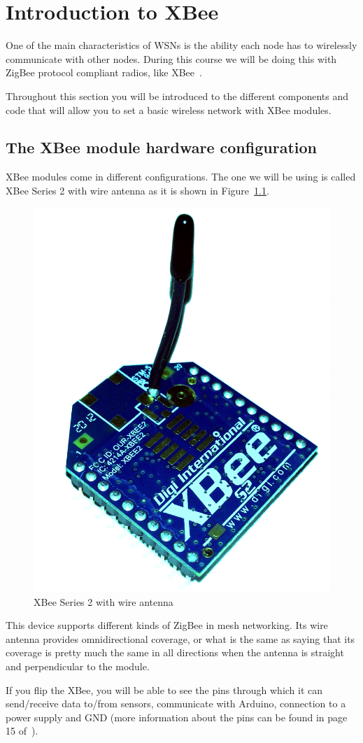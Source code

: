 \chapter{Introduction to XBee}\label{introToXBee}

One of the main characteristics of WSNs is the ability each node has to wirelessly communicate with other nodes. 
During this course we will be doing this with ZigBee protocol compliant radios, like XBee~\cite{faludi2010bws}.

Throughout this section you will be introduced to the different components and code that will allow you to set a basic wireless network with XBee modules.

\section{The XBee module hardware configuration}\label{xbee:hardware}

XBee modules come in different configurations. The one we will be using is called XBee Series 2 with wire antenna as it is shown in Figure~\ref{fig:xbee}.

\begin{figure}[htbp]
  \centering
  \includegraphics[width=0.4\linewidth]{figures/xbee.eps}
  \caption{XBee Series 2 with wire antenna
  \label{fig:xbee}}
\end{figure}

This device supports different kinds of ZigBee in mesh networking. Its wire antenna provides omnidirectional coverage, or what is the same as saying that its coverage is pretty much the same in all directions when the antenna is straight and perpendicular to the module.

If you flip the XBee, you will be able to see the pins through which it can send/receive data to/from sensors, communicate with Arduino, connection to a power supply and GND (more information about the pins can be found in page 15 of~\cite{faludi2010bws}).

